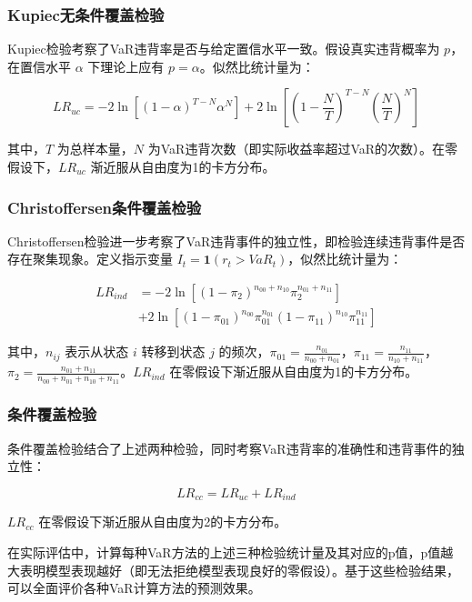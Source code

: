 \documentclass[12pt, a4paper]{article}
\begin{document}
\subsubsection{Kupiec无条件覆盖检验}
Kupiec检验考察了VaR违背率是否与给定置信水平一致。假设真实违背概率为 $p$，在置信水平 $\alpha$ 下理论上应有 $p = \alpha$。似然比统计量为：

\begin{equation}
LR_{uc} = -2 \ln\left[(1-\alpha)^{T-N} \alpha^N\right] + 2 \ln\left[(1-\frac{N}{T})^{T-N} (\frac{N}{T})^N\right]
\end{equation}

其中，$T$ 为总样本量，$N$ 为VaR违背次数（即实际收益率超过VaR的次数）。在零假设下，$LR_{uc}$ 渐近服从自由度为1的卡方分布。

\subsubsection{Christoffersen条件覆盖检验}
Christoffersen检验进一步考察了VaR违背事件的独立性，即检验连续违背事件是否存在聚集现象。定义指示变量 $I_t = \mathbf{1}(r_t > VaR_t)$，似然比统计量为：

\begin{equation}
\begin{aligned}
LR_{ind} &= -2 \ln\left[(1-\pi_2)^{n_{00}+n_{10}} \pi_2^{n_{01}+n_{11}}\right] \\
&+ 2 \ln\left[(1-\pi_{01})^{n_{00}} \pi_{01}^{n_{01}} (1-\pi_{11})^{n_{10}} \pi_{11}^{n_{11}}\right]
\end{aligned}
\end{equation}

其中，$n_{ij}$ 表示从状态 $i$ 转移到状态 $j$ 的频次，$\pi_{01} = \frac{n_{01}}{n_{00}+n_{01}}$，$\pi_{11} = \frac{n_{11}}{n_{10}+n_{11}}$，$\pi_2 = \frac{n_{01}+n_{11}}{n_{00}+n_{01}+n_{10}+n_{11}}$。$LR_{ind}$ 在零假设下渐近服从自由度为1的卡方分布。

\subsubsection{条件覆盖检验}
条件覆盖检验结合了上述两种检验，同时考察VaR违背率的准确性和违背事件的独立性：

\begin{equation}
LR_{cc} = LR_{uc} + LR_{ind}
\end{equation}

$LR_{cc}$ 在零假设下渐近服从自由度为2的卡方分布。

在实际评估中，计算每种VaR方法的上述三种检验统计量及其对应的p值，p值越大表明模型表现越好（即无法拒绝模型表现良好的零假设）。基于这些检验结果，可以全面评价各种VaR计算方法的预测效果。
\end{document}
